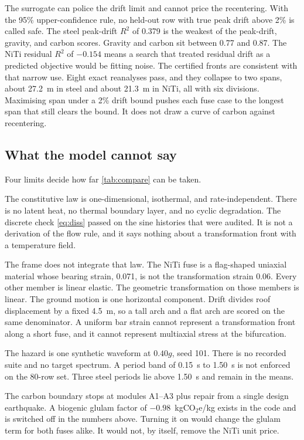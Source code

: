 \documentclass[10pt,a4paper]{article}
\begin{document}
The surrogate can police the drift limit and cannot price the recentering. With the 95\% upper-confidence rule, no held-out row with true peak drift above 2\% is called safe. The steel peak-drift $R^2$ of 0.379 is the weakest of the peak-drift, gravity, and carbon scores. Gravity and carbon sit between 0.77 and 0.87. The NiTi residual $R^2$ of $-0.154$ means a search that treated residual drift as a predicted objective would be fitting noise. The certified fronts are consistent with that narrow use. Eight exact reanalyses pass, and they collapse to two spans, about 27.2~m in steel and about 21.3~m in NiTi, all with six divisions. Maximising span under a 2\% drift bound pushes each fuse case to the longest span that still clears the bound. It does not draw a curve of carbon against recentering.

\subsection{What the model cannot say}

Four limits decide how far \cref{tab:compare} can be taken.

The constitutive law is one-dimensional, isothermal, and rate-independent. There is no latent heat, no thermal boundary layer, and no cyclic degradation. The discrete check \eqref{eq:diss} passed on the sine histories that were audited. It is not a derivation of the flow rule, and it says nothing about a transformation front with a temperature field.

The frame does not integrate that law. The NiTi fuse is a flag-shaped uniaxial material whose bearing strain, 0.071, is not the transformation strain 0.06. Every other member is linear elastic. The geometric transformation on those members is linear. The ground motion is one horizontal component. Drift divides roof displacement by a fixed 4.5~m, so a tall arch and a flat arch are scored on the same denominator. A uniform bar strain cannot represent a transformation front along a short fuse, and it cannot represent multiaxial stress at the bifurcation.

The hazard is one synthetic waveform at $0.40g$, seed 101. There is no recorded suite and no target spectrum. A period band of 0.15~s to 1.50~s is not enforced on the 80-row set. Three steel periods lie above 1.50~s and remain in the means.

The carbon boundary stops at modules A1--A3 plus repair from a single design earthquake. A biogenic glulam factor of $-0.98$~kgCO$_2$e/kg exists in the code and is switched off in the numbers above. Turning it on would change the glulam term for both fuses alike. It would not, by itself, remove the NiTi unit price.
\end{document}
